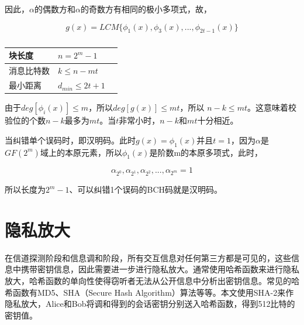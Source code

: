 因此，$\alpha$的偶数方和$\alpha$的奇数方有相同的极小多项式，故，

\begin{equation}
    g(x) = LCM\{\phi_1(x), \phi_3(x), ... , \phi_{2t-1}(x)\}
\end{equation}

\begin{table}[]
  \centering
  \begin{tabular}{|l|l|l|}
  \hline
  块长度 & $ n = 2^m - 1 $  \\ \hline
  消息比特数 & $ k \leq n - mt $  \\ \hline
  最小距离 & $ d_{min} \leq 2t + 1 $  \\ \hline
  \end{tabular}
  \caption{
  \label{}}
\end{table}

由于$ deg[\phi_i(x)] \leq m $，所以$ deg[g(x)] \leq mt $，所以 $ n -k \leq mt $。这意味着校验位的个数$n - k $最多为$mt$。当$t$非常小时，$n - k $和$mt$十分相近。

当纠错单个误码时，即汉明码。此时$g(x) = \phi_1(x)$并且$t = 1$，因为$\alpha$是$GF(2^m)$域上的本原元素，所以$\phi_1(x)$是阶数m的本原多项式，此时，

\begin{equation}
    \alpha_{2^0}, \alpha_{2^1}, \alpha_{2^2}, ..., \alpha_{2^m} = 1
\end{equation}

所以长度为$2^m - 1$、可以纠错1个误码的BCH码就是汉明码。

\section{隐私放大}

在信道探测阶段和信息调和阶段，所有交互信息对任何第三方都是可见的，这些信息中携带密钥信息，因此需要进一步进行隐私放大。通常使用哈希函数来进行隐私放大，哈希函数的单向性使得窃听者无法从公开信息中分析出密钥信息。常见的哈希函数有MD5、SHA（Secure Hash Algorithm）算法等等。本文使用SHA-2来作隐私放大，Alice和Bob将调和得到的会话密钥分别送入哈希函数，得到512比特的密钥值。